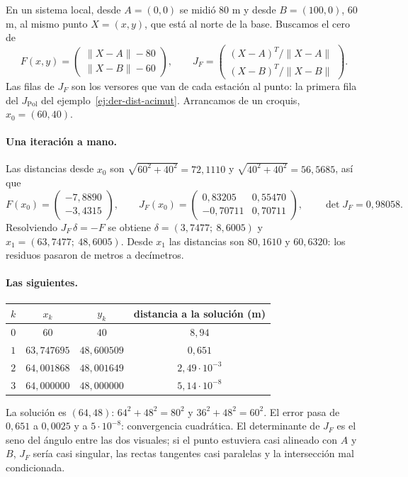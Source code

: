 \begin{ejemplo}\label{ej:der-newton}
En un sistema local, desde \(A=(0,0)\) se midió \(80\) m y desde \(B=(100,0)\), \(60\) m, al
mismo punto \(X=(x,y)\), que está al norte de la base. Buscamos el cero de
\[
  F(x,y)=\begin{pmatrix}\lVert X-A\rVert-80\\ \lVert X-B\rVert-60\end{pmatrix},\qquad
  J_F=\begin{pmatrix}(X-A)^T/\lVert X-A\rVert\\ (X-B)^T/\lVert X-B\rVert\end{pmatrix}.
\]
Las filas de \(J_F\) son los versores que van de cada estación al punto: la primera fila del
\(J_{\operatorname{Pol}}\) del ejemplo~\ref{ej:der-dist-acimut}. Arrancamos de un croquis, \(x_0=(60,40)\).

\paragraph{Una iteración a mano.} Las distancias desde \(x_0\) son
\(\sqrt{60^2+40^2}=72{,}1110\) y \(\sqrt{40^2+40^2}=56{,}5685\), así que
\[
  F(x_0)=\begin{pmatrix}-7{,}8890\\-3{,}4315\end{pmatrix},\qquad
  J_F(x_0)=\begin{pmatrix}0{,}83205&0{,}55470\\-0{,}70711&0{,}70711\end{pmatrix},
  \qquad \det J_F=0{,}98058 .
\]
Resolviendo \(J_F\,\delta=-F\) se obtiene \(\delta=(3{,}7477;\ 8{,}6005)\) y
\(x_1=(63{,}7477;\ 48{,}6005)\). Desde \(x_1\) las distancias son \(80{,}1610\) y \(60{,}6320\):
los residuos pasaron de metros a decímetros.

\paragraph{Las siguientes.}
\begin{center}
\begin{tabular}{cccc}
\(k\) & \(x_k\) & \(y_k\) & distancia a la solución (m)\\\hline
\(0\) & \(60\) & \(40\) & \(8{,}94\)\\
\(1\) & \(63{,}747695\) & \(48{,}600509\) & \(0{,}651\)\\
\(2\) & \(64{,}001868\) & \(48{,}001649\) & \(2{,}49\cdot10^{-3}\)\\
\(3\) & \(64{,}000000\) & \(48{,}000000\) & \(5{,}14\cdot10^{-8}\)
\end{tabular}
\end{center}
La solución es \((64,48)\): \(64^2+48^2=80^2\) y \(36^2+48^2=60^2\). El error pasa de
\(0{,}651\) a \(0{,}0025\) y a \(5\cdot10^{-8}\): convergencia cuadrática. El determinante de \(J_F\) es el seno del ángulo entre las dos visuales; si el punto
estuviera casi alineado con \(A\) y \(B\), \(J_F\) sería casi singular, las rectas tangentes
casi paralelas y la intersección mal condicionada.
\end{ejemplo}

